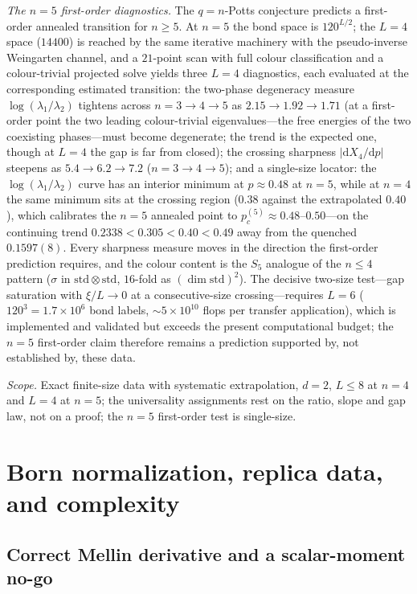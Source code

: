 \documentclass[aps,prx,reprint,superscriptaddress,nobibnotes,longbibliography]{revtex4-2}
\theoremstyle{remark}
\begin{document}
\emph{The $n=5$ first-order diagnostics.}  The $q=n$-Potts conjecture predicts a first-order annealed transition for $n\ge5$.  At $n=5$ the bond space is $120^{L/2}$; the $L=4$ space ($14400$) is reached by the same iterative machinery with the pseudo-inverse Weingarten channel, and a $21$-point scan with full colour classification and a colour-trivial projected solve yields three $L=4$ diagnostics, each evaluated at the corresponding estimated transition: the two-phase degeneracy measure $\log(\lambda_1/\lambda_2)$ tightens across $n=3\to4\to5$ as $2.15\to1.92\to1.71$ (at a first-order point the two leading colour-trivial eigenvalues---the free energies of the two coexisting phases---must become degenerate; the trend is the expected one, though at $L=4$ the gap is far from closed); the crossing sharpness $|\mathrm dX_4/\mathrm dp|$ steepens as $5.4\to6.2\to7.2$ ($n=3\to4\to5$); and a single-size locator: the $\log(\lambda_1/\lambda_2)$ curve has an interior minimum at $p\approx0.48$ at $n=5$, while at $n=4$ the same minimum sits at the crossing region ($0.38$ against the extrapolated $0.40$), which calibrates the $n=5$ annealed point to $p_c^{(5)}\approx0.48$--$0.50$---on the continuing trend $0.2338<0.305<0.40<0.49$ away from the quenched $0.1597(8)$.  Every sharpness measure moves in the direction the first-order prediction requires, and the colour content is the $S_5$ analogue of the $n\le4$ pattern ($\sigma$ in $\mathrm{std}\otimes\mathrm{std}$, $16$-fold as $(\dim\mathrm{std})^2$).  The decisive two-size test---gap saturation with $\xi/L\to0$ at a consecutive-size crossing---requires $L=6$ ($120^3=1.7\times10^6$ bond labels, $\sim5\times10^{10}$ flops per transfer application), which is implemented and validated but exceeds the present computational budget; the $n=5$ first-order claim therefore remains a prediction supported by, not established by, these data.

\emph{Scope.}  Exact finite-size data with systematic extrapolation, $d=2$, $L\le8$ at $n=4$ and $L=4$ at $n=5$; the universality assignments rest on the ratio, slope and gap law, not on a proof; the $n=5$ first-order test is single-size.

\section{Born normalization, replica data, and complexity}

\subsection{Correct Mellin derivative and a scalar-moment no-go}
\end{document}
